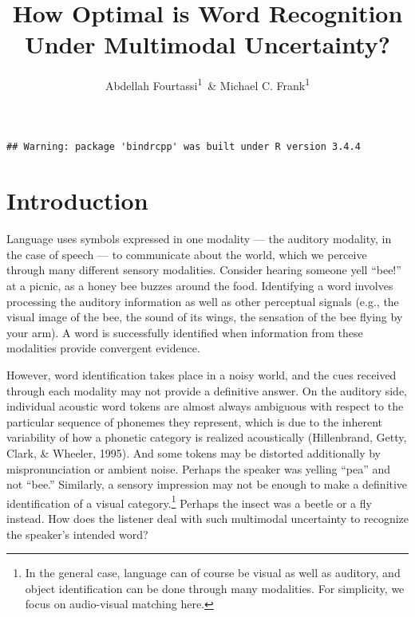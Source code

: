 \documentclass[english,,man,floatsintext]{apa6}
\title{How Optimal is Word Recognition Under Multimodal Uncertainty?}
\author{Abdellah Fourtassi\textsuperscript{1}~\& Michael C.
Frank\textsuperscript{1}}
\date{}
\affiliation{
\vspace{0.5cm}
\textsuperscript{1} Department of Psychology, Stanford University}
\let\rmarkdownfootnote\footnote%
\def\footnote{\protect\rmarkdownfootnote}
\theoremstyle{definition}
\theoremstyle{definition}
\theoremstyle{definition}
\theoremstyle{remark}
\begin{document}
\maketitle

\begin{verbatim}
## Warning: package 'bindrcpp' was built under R version 3.4.4
\end{verbatim}

\section{Introduction}\label{introduction}

Language uses symbols expressed in one modality --- the auditory
modality, in the case of speech --- to communicate about the world,
which we perceive through many different sensory modalities. Consider
hearing someone yell \enquote{bee!} at a picnic, as a honey bee buzzes
around the food. Identifying a word involves processing the auditory
information as well as other perceptual signals (e.g., the visual image
of the bee, the sound of its wings, the sensation of the bee flying by
your arm). A word is successfully identified when information from these
modalities provide convergent evidence.

However, word identification takes place in a noisy world, and the cues
received through each modality may not provide a definitive answer. On
the auditory side, individual acoustic word tokens are almost always
ambiguous with respect to the particular sequence of phonemes they
represent, which is due to the inherent variability of how a phonetic
category is realized acoustically (Hillenbrand, Getty, Clark, \&
Wheeler, 1995). And some tokens may be distorted additionally by
mispronunciation or ambient noise. Perhaps the speaker was yelling
\enquote{pea} and not \enquote{bee.} Similarly, a sensory impression may
not be enough to make a definitive identification of a visual
category.\footnote{In the general case, language can of course be visual as well as auditory, and object identification can be done through many modalities. For simplicity, we focus on audio-visual matching here.}
Perhaps the insect was a beetle or a fly instead. How does the listener
deal with such multimodal uncertainty to recognize the speaker's
intended word?
\end{document}
